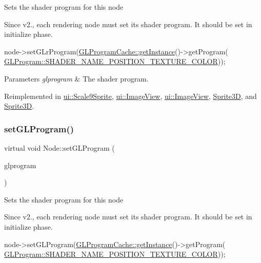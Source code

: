 Sets the shader program for this node

Since v2., each rendering node must set its shader program. It should be set in initialize phase. 
\begin{DoxyCode}
node->setGLrProgram(\hyperlink{classGLProgramCache_a084359da301355ed6c32b12689669d37}{GLProgramCache::getInstance}()->getProgram(
      \hyperlink{classGLProgram_a7f7e223328336e8792add8633171aa96}{GLProgram::SHADER\_NAME\_POSITION\_TEXTURE\_COLOR}));
\end{DoxyCode}



\begin{DoxyParams}{Parameters}
{\em glprogram} & The shader program. \\
\hline
\end{DoxyParams}


Reimplemented in \hyperlink{classui_1_1Scale9Sprite_add60f59da603e007e2d4794d667f40bb}{ui\+::\+Scale9\+Sprite}, \hyperlink{classui_1_1ImageView_adf4dee6b3cee1d981f2a671dcef2ce7a}{ui\+::\+Image\+View}, \hyperlink{classui_1_1ImageView_a98d9a45e777ea30849634eacf5b58509}{ui\+::\+Image\+View}, \hyperlink{classSprite3D_aa71609d7f3a35a0d86a70f28bafffa9c}{Sprite3D}, and \hyperlink{classSprite3D_addcfa64162310ce40ec097738442af9f}{Sprite3D}.

\mbox{\label{classNode_aa257b40f74bea71ab419f2b8d76f6ba4}} 
\subsubsection{\texorpdfstring{set\+G\+L\+Program()}{setGLProgram()}\hspace{0.1cm}{\footnotesize\ttfamily [2/2]}}
{\footnotesize\ttfamily virtual void Node\+::set\+G\+L\+Program (\begin{DoxyParamCaption}\item[{\hyperlink{classGLProgram}{G\+L\+Program} $\ast$}]{glprogram }\end{DoxyParamCaption})\hspace{0.3cm}{\ttfamily [virtual]}}

Sets the shader program for this node

Since v2., each rendering node must set its shader program. It should be set in initialize phase. 
\begin{DoxyCode}
node->setGLProgram(\hyperlink{classGLProgramCache_a084359da301355ed6c32b12689669d37}{GLProgramCache::getInstance}()->getProgram(
      \hyperlink{classGLProgram_a7f7e223328336e8792add8633171aa96}{GLProgram::SHADER\_NAME\_POSITION\_TEXTURE\_COLOR}));
\end{DoxyCode}



